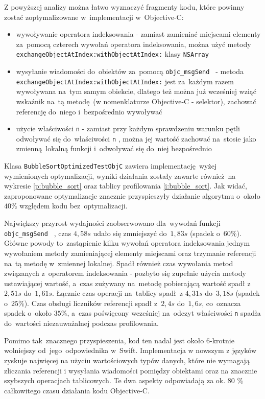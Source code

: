 \documentclass[mgr, shortabstract]{iithesis}
\newcommand{\objcinline}[1]{
    \texttt{#1}
}
\begin{document}
Z powyższej analizy można łatwo wyznaczyć fragmenty kodu, które powinny zostać zoptymalizowane w~implementacji w~Objective-C:

\begin{itemize}
    \item wywoływanie operatora indeksowania - zamiast zamieniać miejscami elementy za~pomocą czterech wywołań operatora indeksowania, można użyć metody \objcinline{exchangeObjectAtIndex:withObjectAtIndex:} klasy \objcinline{NSArray}
    \item wysyłanie wiadomości do~obiektów za~pomocą \objcinline{objc_msgSend } - metoda \objcinline{exchangeObjectAtIndex:withObjectAtIndex:} jest za~każdym razem wywoływana na~tym samym obiekcie, dlatego też można już wcześniej wziąć wskaźnik na~tą metodę (w nomenklaturze Objective-C - selektor), zachować referencję do~niego i~bezpośrednio wywoływać
    \item użycie właściwości \objcinline{n} - zamiast przy każdym sprawdzeniu warunku pętli odwoływać się do~właściwości \objcinline{n}, można jej wartość zachować na~stosie jako zmienną lokalną funkcji i~odwoływać się do~niej bezpośrednio
\end{itemize}

Klasa \objcinline{BubbleSortOptimizedTestObjC} zawiera implementację wyżej wymienionych optymalizacji, wyniki działania zostały zawarte również na wykresie \ref{p:bubble_sort} oraz tablicy profilowania \ref{i:bubble_sort}. Jak widać, zaproponowane optymalizacje znacznie przyspieszyły działanie algorytmu o~około $40\%$ względem kodu bez~optymalizacji.

Największy przyrost wydajności zaobserwowano dla~wywołań funkcji \objcinline{objc_msgSend }, czas $4,58s$ udało się zmniejszyć do~$1,83s$ (spadek o~$60\%$). Główne powody to~zastąpienie kilku wywołań operatora indeksowania jednym wywołaniem metody zamieniającej elementy miejscami oraz trzymanie referencji na~tą metodę w~zmiennej lokalnej. Spadł również czas wywołania metod związanych z~operatorem indeksowania - pozbyto się zupełnie użycia metody ustawiającej wartość, a~czas zużywany na~metodę pobierającą wartość spadł z~$2,51s$ do~$1,61s$. Łącznie czas operacji na~tablicy spadł z $4,31s$ do~$3,18s$ (spadek o~$25\%$). Czas obsługi liczników referencji spadł z~$2,4s$ do~$1,6s$, co~oznacza spadek o~około $35\%$, a~czas poświęcony wcześniej na~odczyt właściwości \objcinline{n} spadła do~wartości niezauważalnej podczas profilowania.

Pomimo tak~znacznego przyspieszenia, kod ten nadal jest około 6-krotnie wolniejszy od~jego~odpowiednika w~Swift. Implementacja w nowszym z języków zyskuje najwięcej na użyciu wartościowych typów danych, które nie wymagają zliczania referencji i wysyłania wiadomości pomiędzy obiektami oraz na znacznie szybszych operacjach tablicowych. Te dwa aspekty odpowiadają za ok. 80 \% całkowitego czasu działania kodu Objective-C.
\end{document}
